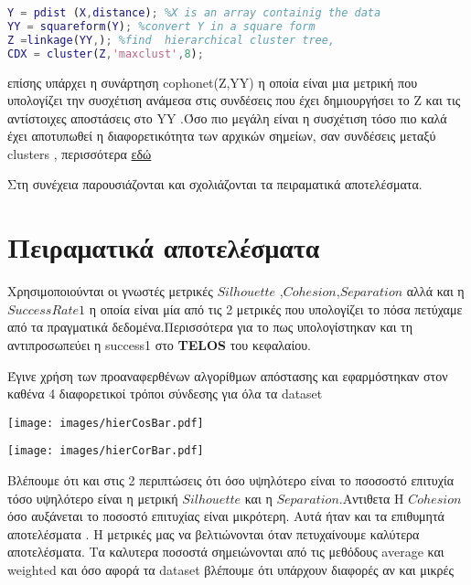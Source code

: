\begin{lstlisting}[language=Matlab]
%simple example of hierarchical clustering
Y = pdist (X,distance); %X is an array containig the data
YY = squareform(Y); %convert Y in a square form
Z =linkage(YY,); %find  hierarchical cluster tree,
CDX = cluster(Z,'maxclust',8);
\end{lstlisting}


επίσης υπάρχει η συνάρτηση cophonet(Z,YY) η οποία είναι μια μετρική που υπολογίζει την συσχέτιση ανάμεσα στις συνδέσεις που έχει δημιουργήσει το Z και τις αντίστοιχες αποστάσεις στο YY .Όσο πιο μεγάλη είναι η συσχέτιση τόσο πιο καλά έχει αποτυπωθεί η διαφορετικότητα των αρχικών σημείων, σαν συνδέσεις μεταξύ clusters , περισσότερα
\href{https://en.wikipedia.org/wiki/Cophenetic\_correlation}{εδώ}

Στη συνέχεια παρουσιάζονται και σχολιάζονται τα πειραματικά αποτελέσματα.

\section{Πειραματικά αποτελέσματα}

Χρησιμοποιούνται οι γνωστές μετρικές $Silhouette$ ,$Cohesion$,$Separation$
αλλά και η $Success Rate 1$ η οποία είναι μία από τις 2 μετρικές που  υπολογίζει το πόσα πετύχαμε από τα πραγματικά δεδομένα.Περισσότερα για το πως υπολογίστηκαν και τη αντιπροσωπεύει η success1 στο \textbf{TELOS} του κεφαλαίου.   	

Έγινε χρήση των προαναφερθένων  αλγορίθμων απόστασης και εφαρμόστηκαν στον καθένα 4 διαφορετικοί τρόποι σύνδεσης για όλα τα dataset



\noindent\begin{minipage}{\linewidth}
	\texttt{[image: images/hierCosBar.pdf]}
	\label{fig:CosineHier}
\end{minipage}

\noindent\begin{minipage}{\linewidth}
	\texttt{[image: images/hierCorBar.pdf]}
	\label{fig:CorrelationHier}
\end{minipage}

\newpage
Βλέπουμε ότι και στις 2 περιπτώσεις ότι όσο υψηλότερο είναι το πσοσοστό επιτυχία
τόσο υψηλότερο είναι  η μετρική $Silhouette$ και η $Separation$.Αντιθετα H $Cohesion$ όσο αυξάνεται το ποσοστό επιτυχίας είναι μικρότερη. Αυτά ήταν και τα επιθυμητά αποτελέσματα . Η μετρικές μας να βελτιώνονται όταν πετυχαίνουμε καλύτερα αποτελέσματα. 
Τα καλυτερα ποσοστά σημειώνονται από τις μεθόδους average και weighted
και όσο αφορά τα dataset βλέπουμε ότι υπάρχουν διαφορές αν και μικρές

